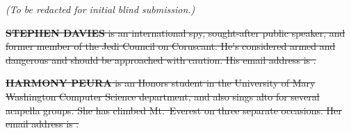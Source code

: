 \documentclass{scspaperproc}
\begin{document}
\textit{(To be redacted for initial blind submission.)}

\sout{\textbf{\uppercase{Stephen Davies}} is an international spy, sought-after
public speaker, and former member of the Jedi Council on Coruscant. He's
considered armed and dangerous and should be approached with caution.
His email address is .}

\sout{\textbf{\uppercase{Harmony Peura}} is an Honors student in the University of
Mary Washington Computer Science department, and also sings alto for several
acapella groups. She has climbed Mt.~Everest on three separate occasions. Her
email address is .}
\end{document}
